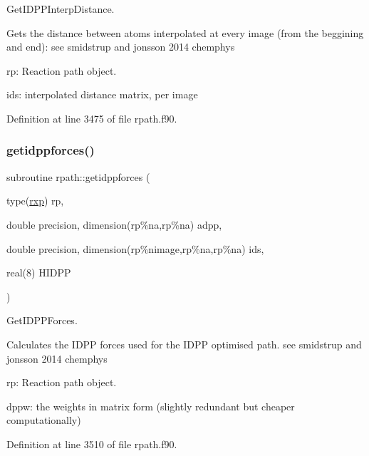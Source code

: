 Get\+I\+D\+P\+P\+Interp\+Distance. 

Gets the distance between atoms interpolated at every image (from the beggining and end)\+: see smidstrup and jonsson 2014 chemphys


\begin{DoxyItemize}
\item rp\+: Reaction path object.
\item ids\+: interpolated distance matrix, per image 
\end{DoxyItemize}

Definition at line 3475 of file rpath.\+f90.

\mbox{\label{namespacerpath_a65a712550505b1542b4f01af95a18c1a}} 
\subsubsection{\texorpdfstring{getidppforces()}{getidppforces()}}
{\footnotesize\ttfamily subroutine rpath\+::getidppforces (\begin{DoxyParamCaption}\item[{type(\mbox{\hyperlink{structrpath_1_1rxp}{rxp}})}]{rp,  }\item[{double precision, dimension(rp\%na,rp\%na)}]{adpp,  }\item[{double precision, dimension(rp\%nimage,rp\%na,rp\%na)}]{ids,  }\item[{real(8)}]{H\+I\+D\+PP }\end{DoxyParamCaption})}



Get\+I\+D\+P\+P\+Forces. 

Calculates the I\+D\+PP forces used for the I\+D\+PP optimised path. see smidstrup and jonsson 2014 chemphys


\begin{DoxyItemize}
\item rp\+: Reaction path object.
\item dppw\+: the weights in matrix form (slightly redundant but cheaper computationally) 
\end{DoxyItemize}

Definition at line 3510 of file rpath.\+f90.

\mbox{\label{namespacerpath_a4749f3881a10626d54544110e0eb1cba}} 
